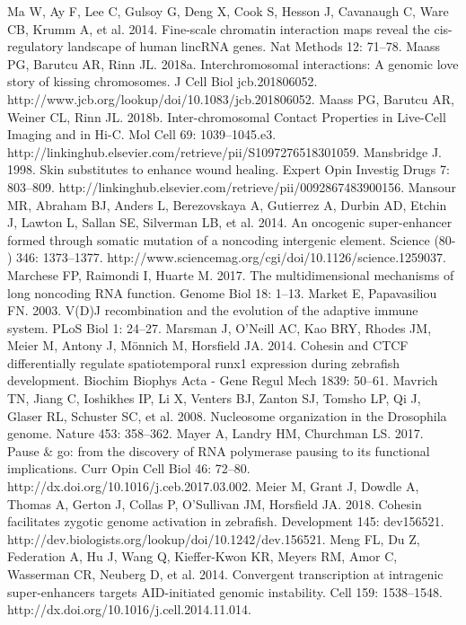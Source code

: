\begin{thebibliography}{1}
	 Ma W, Ay F, Lee C, Gulsoy G, Deng X, Cook S, Hesson J, Cavanaugh C, Ware CB, Krumm A, et al. 2014. Fine-scale chromatin interaction maps reveal the cis-regulatory landscape of human lincRNA genes. Nat Methods 12: 71–78.
	 Maass PG, Barutcu AR, Rinn JL. 2018a. Interchromosomal interactions: A genomic love story of kissing chromosomes. J Cell Biol jcb.201806052. http://www.jcb.org/lookup/doi/10.1083/jcb.201806052.
	 Maass PG, Barutcu AR, Weiner CL, Rinn JL. 2018b. Inter-chromosomal Contact Properties in Live-Cell Imaging and in Hi-C. Mol Cell 69: 1039–1045.e3. http://linkinghub.elsevier.com/retrieve/pii/S1097276518301059.
	 Mansbridge J. 1998. Skin substitutes to enhance wound healing. Expert Opin Investig Drugs 7: 803–809. http://linkinghub.elsevier.com/retrieve/pii/0092867483900156.
	 Mansour MR, Abraham BJ, Anders L, Berezovskaya A, Gutierrez A, Durbin AD, Etchin J, Lawton L, Sallan SE, Silverman LB, et al. 2014. An oncogenic super-enhancer formed through somatic mutation of a noncoding intergenic element. Science (80- ) 346: 1373–1377. http://www.sciencemag.org/cgi/doi/10.1126/science.1259037.
	 Marchese FP, Raimondi I, Huarte M. 2017. The multidimensional mechanisms of long noncoding RNA function. Genome Biol 18: 1–13.
	 Market E, Papavasiliou FN. 2003. V(D)J recombination and the evolution of the adaptive immune system. PLoS Biol 1: 24–27.
	 Marsman J, O’Neill AC, Kao BRY, Rhodes JM, Meier M, Antony J, Mönnich M, Horsfield JA. 2014. Cohesin and CTCF differentially regulate spatiotemporal runx1 expression during zebrafish development. Biochim Biophys Acta - Gene Regul Mech 1839: 50–61.
	 Mavrich TN, Jiang C, Ioshikhes IP, Li X, Venters BJ, Zanton SJ, Tomsho LP, Qi J, Glaser RL, Schuster SC, et al. 2008. Nucleosome organization in the Drosophila genome. Nature 453: 358–362.
	 Mayer A, Landry HM, Churchman LS. 2017. Pause \& go: from the discovery of RNA polymerase pausing to its functional implications. Curr Opin Cell Biol 46: 72–80. http://dx.doi.org/10.1016/j.ceb.2017.03.002.
	 Meier M, Grant J, Dowdle A, Thomas A, Gerton J, Collas P, O’Sullivan JM, Horsfield JA. 2018. Cohesin facilitates zygotic genome activation in zebrafish. Development 145: dev156521. http://dev.biologists.org/lookup/doi/10.1242/dev.156521.
	 Meng FL, Du Z, Federation A, Hu J, Wang Q, Kieffer-Kwon KR, Meyers RM, Amor C, Wasserman CR, Neuberg D, et al. 2014. Convergent transcription at intragenic super-enhancers targets AID-initiated genomic instability. Cell 159: 1538–1548. http://dx.doi.org/10.1016/j.cell.2014.11.014.

\end{thebibliography}
